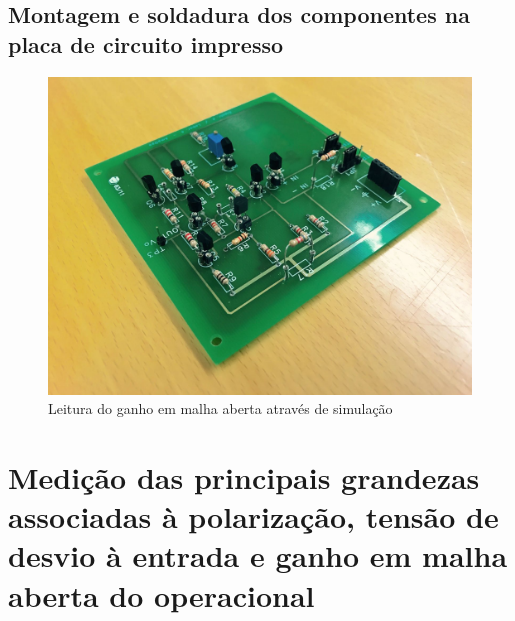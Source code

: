 \documentclass[a4paper]{article}
\begin{document}
    \subsection{Montagem e soldadura dos componentes na placa de circuito impresso}
        \medskip
        \begin{figure}[H]
        \centering
        \includegraphics[width=\textwidth]{figura2_circuito_soldado.jpeg}
        \caption{\label{fig:circuitoSoldado}Leitura do ganho em malha aberta através de simulação}
        \end{figure}
        
\clearpage

\section{Medição das principais grandezas associadas à polarização, tensão de desvio à entrada e ganho em malha aberta do operacional}
    \bigskip
\end{document}
